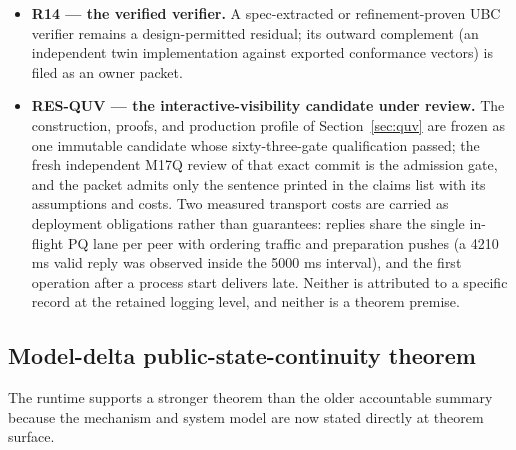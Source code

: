 \documentclass[11pt]{article}
\newcommand{\code}[1]{\texttt{#1}}
\begin{document}
\begin{itemize}[leftmargin=1.5em]
seven of ten rows, so the printed Class C figures are
\code{variance\_caveated} (Section~\ref{sec:measured-costs}) and were
admitted into the measured-results registry under exactly that verdict.
What remains open is strictly stronger: a reproduced-within-threshold
promotion for injection TPS, and any measurement whose honesty class
exceeds a measured container --- the runtime supplied no provider host
attestation, so physical-host placement is unproven.
\item \textbf{R14 --- the verified verifier.} A spec-extracted or
refinement-proven UBC verifier remains a design-permitted residual; its
outward complement (an independent twin implementation against exported
conformance vectors) is filed as an owner packet.
\item \textbf{RES-QUV --- the interactive-visibility candidate under
review.} The construction, proofs, and production profile of
Section~\ref{sec:quv} are frozen as one immutable candidate whose
sixty-three-gate qualification passed; the fresh independent M17Q review of
that exact commit is the admission gate, and the packet admits only the
sentence printed in the claims list with its assumptions and costs. Two
measured transport costs are carried as deployment obligations rather than
guarantees: replies share the single in-flight PQ lane per peer with
ordering traffic and preparation pushes (a 4210 ms valid reply was
observed inside the 5000 ms interval), and the first operation after a
process start delivers late. Neither is attributed to a specific record at
the retained logging level, and neither is a theorem premise.
\end{itemize}

\subsection{Model-delta public-state-continuity theorem}
\label{sec:accountable-ba}

The runtime supports a stronger theorem than the older accountable summary
because the mechanism and system model are now stated directly at theorem
surface.
\end{document}

